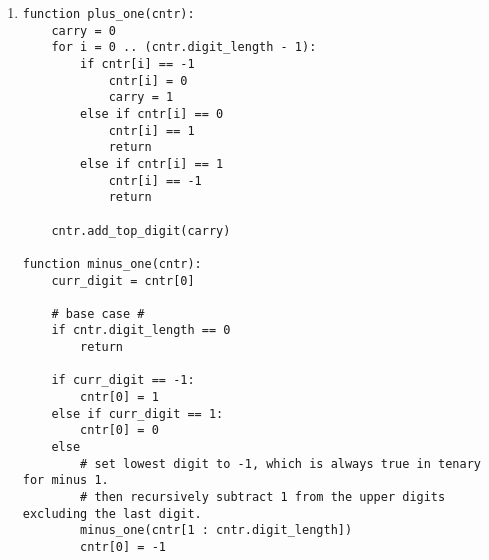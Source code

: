 \documentclass{article}
\begin{document}
\begin{enumerate}
\begin{enumerate}
            \item
                \begin{verbatim}
function plus_one(cntr):
    carry = 0
    for i = 0 .. (cntr.digit_length - 1):
        if cntr[i] == -1
            cntr[i] = 0 
            carry = 1
        else if cntr[i] == 0
            cntr[i] == 1
            return
        else if cntr[i] == 1
            cntr[i] == -1
            return
            
    cntr.add_top_digit(carry)
            
function minus_one(cntr):
    curr_digit = cntr[0]
    
    # base case #
    if cntr.digit_length == 0
        return
    
    if curr_digit == -1:
        cntr[0] = 1
    else if curr_digit == 1:
        cntr[0] = 0
    else
        # set lowest digit to -1, which is always true in tenary for minus 1.
        # then recursively subtract 1 from the upper digits excluding the last digit.
        minus_one(cntr[1 : cntr.digit_length])
        cntr[0] = -1
                \end{verbatim}
        \end{enumerate}
\end{enumerate}
\end{document}
